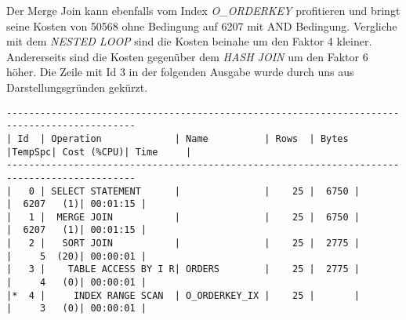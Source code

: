 \documentclass[11pt,a4paper,parskip=half]{scrartcl}
\begin{document}
Der Merge Join kann ebenfalls vom Index \emph{O\_ORDERKEY} profitieren und bringt seine Kosten von 50568 ohne Bedingung auf 6207 mit AND Bedingung. Vergliche mit dem \emph{NESTED LOOP} sind die Kosten beinahe um den Faktor 4 kleiner. Andererseits sind die Kosten gegenüber dem \emph{HASH JOIN} um den Faktor 6 höher. Die Zeile mit Id 3 in der folgenden Ausgabe wurde durch uns aus Darstellungsgründen gekürzt.
\begin{lstlisting}
---------------------------------------------------------------------------------------------                                                                                                                                                                                                    
| Id  | Operation             | Name          | Rows  | Bytes |TempSpc| Cost (%CPU)| Time     |                                                                                                                                                                                                      
---------------------------------------------------------------------------------------------
|   0 | SELECT STATEMENT      |               |    25 |  6750 |       |  6207   (1)| 00:01:15 |                                                                                                                                                                                                      
|   1 |  MERGE JOIN           |               |    25 |  6750 |       |  6207   (1)| 00:01:15 |                                                                                                                                                                                                      
|   2 |   SORT JOIN           |               |    25 |  2775 |       |     5  (20)| 00:00:01 |                                                                                                                                                                                                      
|   3 |    TABLE ACCESS BY I R| ORDERS        |    25 |  2775 |       |     4   (0)| 00:00:01 |                                                                                                                                                                                                      
|*  4 |     INDEX RANGE SCAN  | O_ORDERKEY_IX |    25 |       |       |     3   (0)| 00:00:01 |                                                                                                                                                                                                      

\end{lstlisting}
\end{document}
